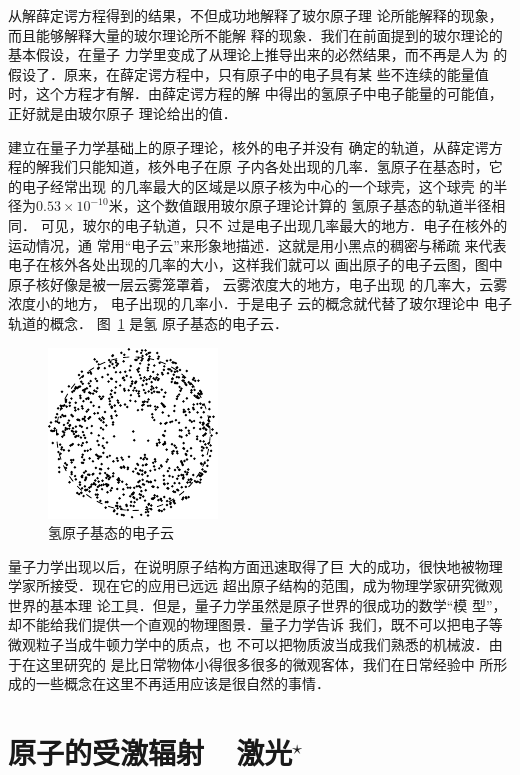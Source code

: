 从解薛定谔方程得到的结果，不但成功地解释了玻尔原子理
论所能解释的现象，而且能够解释大量的玻尔理论所不能解
释的现象．我们在前面提到的玻尔理论的基本假设，在量子
力学里变成了从理论上推导出来的必然结果，而不再是人为
的假设了．原来，在薛定谔方程中，只有原子中的电子具有某
些不连续的能量值时，这个方程才有解．由薛定谔方程的解
中得出的氢原子中电子能量的可能值，正好就是由玻尔原子
理论给出的值．

建立在量子力学基础上的原子理论，核外的电子并没有
确定的轨道，从薛定谔方程的解我们只能知道，核外电子在原
子内各处出现的几率．氢原子在基态时，它的电子经常出现
的几率最大的区域是以原子核为中心的一个球壳，这个球壳
的半径为$0.53\times10^{-10}$米，这个数值跟用玻尔原子理论计算的
氢原子基态的轨道半径相同．
可见，玻尔的电子轨道，只不
过是电子出现几率最大的地方．电子在核外的运动情况，通
常用“电子云”来形象地描述．这就是用小黑点的稠密与稀疏
来代表电子在核外各处出现的几率的大小，这样我们就可以
画出原子的电子云图，图中原子核好像是被一层云雾笼罩着，
云雾浓度大的地方，电子出现
的几率大，云雾浓度小的地方，
电子出现的几率小．于是电子
云的概念就代替了玻尔理论中
电子轨道的概念．
图~\ref{fig_C_8-6} 是氢
原子基态的电子云．

\begin{figure}[htbp]
    \centering
    \includegraphics{fig/C/8-6.pdf}
    \caption{氢原子基态的电子云}\label{fig_C_8-6}
\end{figure}


量子力学出现以后，在说明原子结构方面迅速取得了巨
大的成功，很快地被物理学家所接受．现在它的应用已远远
超出原子结构的范围，成为物理学家研究微观世界的基本理
论工具．但是，量子力学虽然是原子世界的很成功的数学“模
型”，却不能给我们提供一个直观的物理图景．量子力学告诉
我们，既不可以把电子等微观粒子当成牛顿力学中的质点，也
不可以把物质波当成我们熟悉的机械波．由于在这里研究的
是比日常物体小得很多很多的微观客体，我们在日常经验中
所形成的一些概念在这里不再适用应该是很自然的事情．


\section{原子的受激辐射~~激光$^\star$}
